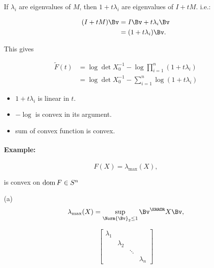 If \( \lambda_i \) are eigenvalues of \( M \), then \( 1 + t \lambda_i \) are eigenvalues of \( I + t M \).  i.e.:

\begin{dmath}\label{eqn:convexOptimizationLecture8:440}
\begin{aligned}
(I + t M) \Bv
&=
I \Bv + t \lambda_i \Bv \\
&=
(1 + t \lambda_i) \Bv.
\end{aligned}
\end{dmath}

This gives

\begin{dmath}\label{eqn:convexOptimizationLecture8:460}
\begin{aligned}
\tilde{F}(t)
&= \log \det X_0^{-1} - \log \prod_{i = 1}^n (1 + t \lambda_i) \\
&= \log \det X_0^{-1} - \sum_{i = 1}^n \log (1 + t \lambda_i)
\end{aligned}
\end{dmath}

\begin{itemize}
\item \( 1 + t \lambda_i \) is linear in \( t \).
\item \( -\log \) is convex in its argument.
\item sum of convex function is convex.
\end{itemize}

\paragraph{Example:}

\begin{dmath}\label{eqn:convexOptimizationLecture8:480}
F(X) = \lambda_\max(X),
\end{dmath}

is convex on \( \operatorname{dom} F \in S^n \)

(a)
\begin{dmath}\label{eqn:convexOptimizationLecture8:500}
\lambda_{\max} (X) = \sup_{\Norm{\Bv}_2 \le 1} \Bv^\T X \Bv,
\end{dmath}

\begin{dmath}\label{eqn:convexOptimizationLecture8:520}
\begin{bmatrix}
\lambda_1 &           &        & \\
          & \lambda_2 &        & \\
          &           & \ddots & \\
          &           &        & \lambda_n
\end{bmatrix}
\end{dmath}

